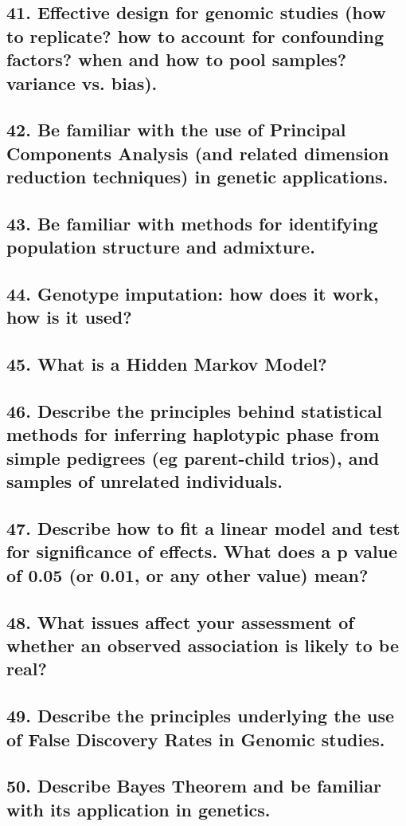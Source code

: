 \documentclass{tufte-handout}
\theoremstyle{noparens}
\begin{document}
\newpage
\subsection{41. Effective design for genomic studies (how to replicate? how to account for confounding factors? when and how to pool samples? variance vs. bias).}

\newpage
\subsection{42. Be familiar with the use of Principal Components Analysis (and related dimension reduction techniques) in genetic applications.}

\newpage
\subsection{43. Be familiar with methods for identifying population structure and admixture.}

\newpage
\subsection{44. Genotype imputation: how does it work, how is it used?}

\newpage
\subsection{45. What is a Hidden Markov Model?}

\newpage
\subsection{46. Describe the principles behind statistical methods for inferring haplotypic phase from simple pedigrees (eg parent-child trios), and samples of unrelated individuals.} 

\newpage
\subsection{47. Describe how to fit a linear model and test for significance of effects. What does a p value of 0.05 (or 0.01, or any other value) mean?} 

\newpage
\subsection{48. What issues affect your assessment of whether an observed association is likely to be real?}

\newpage
\subsection{49. Describe the principles underlying the use of False Discovery Rates in Genomic studies.}

\newpage
\subsection{50. Describe Bayes Theorem and be familiar with its application in genetics.}
\end{document}
